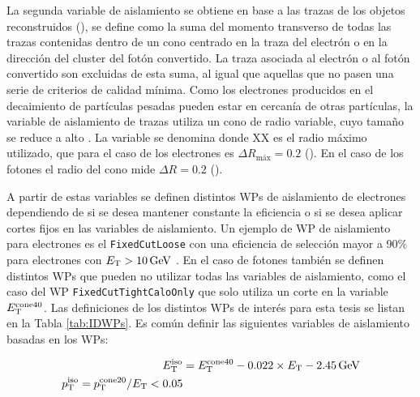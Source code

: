La segunda variable de aislamiento se obtiene en base a las trazas de los objetos reconstruidos (), se define como la suma del momento transverso de todas las trazas contenidas dentro de un cono centrado en la traza del electrón o en la dirección del cluster del fotón convertido. La traza asociada al electrón o al fotón convertido son excluidas de esta suma, al igual que aquellas que no pasen una serie de criterios de calidad mínima. Como los electrones producidos en el decaimiento de partículas pesadas pueden estar en cercanía de otras partículas, la variable de aislamiento de trazas utiliza un cono de radio variable, cuyo tamaño se reduce a alto \pt. La variable se denomina  donde XX es el radio máximo utilizado, que para el caso de los electrones es $\Delta R_{\text{máx}} = 0.2$ (). En el caso de los fotones el radio del cono mide $\Delta R = 0.2$ ().


A partir de estas variables se definen distintos WPs de aislamiento de electrones dependiendo de si se desea mantener constante la eficiencia o si se desea aplicar cortes fijos en las variables de aislamiento. Un ejemplo de WP de aislamiento para electrones es el \texttt{FixedCutLoose} con una eficiencia de selección mayor a 90\% para electrones con $E_{\text{T}}>10\,\text{GeV}$ \cite{EGAM-2018-01}. En el caso de fotones también se definen distintos WPs que pueden no utilizar todas las variables de aislamiento, como el caso del WP \texttt{FixedCutTightCaloOnly} que solo utiliza un corte en la variable $E_{\text{T}}^{\text{cone40}}$. Las definiciones de los distintos WPs de interés para esta tesis se listan en la Tabla \ref{tab:IDWPs}. Es común definir las siguientes variables de aislamiento basadas en los WPs:

\begin{equation}
  \begin{split}
    E_{\text{T}}^{\text{iso}} & = E_{\text{T}}^{\text{cone40}} - 0.022\times E_{\text{T}} - 2.45\,\text{GeV} \\
    p_{\text{T}}^{\text{iso}} = p_{\text{T}}^{\text{cone20}}/E_{\text{T}}<0.05
  \end{split}
\end{equation}
 
